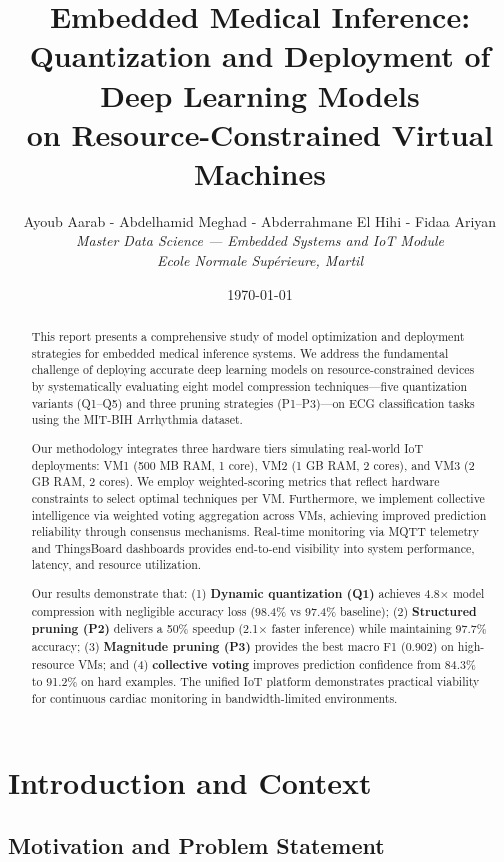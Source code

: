 \documentclass[12pt, a4paper]{article}
\title{\textbf{Embedded Medical Inference: Quantization and Deployment of Deep Learning Models\\on Resource-Constrained Virtual Machines}}
\author{Ayoub Aarab - Abdelhamid Meghad - Abderrahmane El Hihi - Fidaa Ariyan\\
\textit{Master Data Science — Embedded Systems and IoT Module}\\
\textit{Ecole Normale Supérieure, Martil}}
\date{\today}
\begin{document}
\maketitle

\begin{abstract}
This report presents a comprehensive study of model optimization and deployment strategies for embedded medical inference systems. We address the fundamental challenge of deploying accurate deep learning models on resource-constrained devices by systematically evaluating eight model compression techniques—five quantization variants (Q1–Q5) and three pruning strategies (P1–P3)—on ECG classification tasks using the MIT-BIH Arrhythmia dataset.

Our methodology integrates three hardware tiers simulating real-world IoT deployments: VM1 (500 MB RAM, 1 core), VM2 (1 GB RAM, 2 cores), and VM3 (2 GB RAM, 2 cores). We employ weighted-scoring metrics that reflect hardware constraints to select optimal techniques per VM. Furthermore, we implement collective intelligence via weighted voting aggregation across VMs, achieving improved prediction reliability through consensus mechanisms. Real-time monitoring via MQTT telemetry and ThingsBoard dashboards provides end-to-end visibility into system performance, latency, and resource utilization.

Our results demonstrate that: (1) \textbf{Dynamic quantization (Q1)} achieves 4.8× model compression with negligible accuracy loss (98.4\% vs 97.4\% baseline); (2) \textbf{Structured pruning (P2)} delivers a 50\% speedup (2.1× faster inference) while maintaining 97.7\% accuracy; (3) \textbf{Magnitude pruning (P3)} provides the best macro F1 (0.902) on high-resource VMs; and (4) \textbf{collective voting} improves prediction confidence from 84.3\% to 91.2\% on hard examples. The unified IoT platform demonstrates practical viability for continuous cardiac monitoring in bandwidth-limited environments.
\end{abstract}

\newpage
\tableofcontents
\newpage

\section{Introduction and Context}

\subsection{Motivation and Problem Statement}
\end{document}
